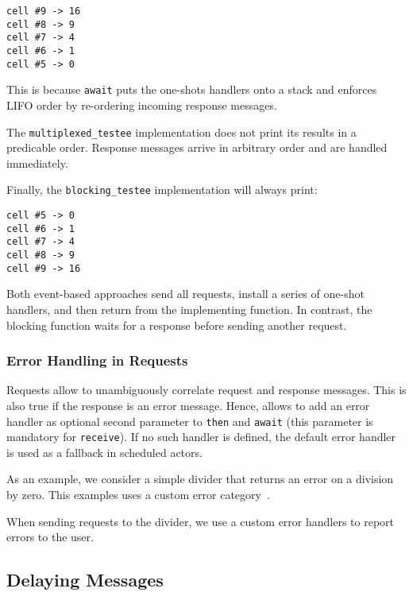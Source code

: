 {\footnotesize\begin{verbatim}
cell #9 -> 16
cell #8 -> 9
cell #7 -> 4
cell #6 -> 1
cell #5 -> 0
\end{verbatim}}

This is because \lstinline^await^ puts the one-shots handlers onto a stack and enforces LIFO order by re-ordering incoming response messages.

The \lstinline^multiplexed_testee^ implementation does not print its results in a predicable order. Response messages arrive in arbitrary order and are handled immediately.

Finally, the \lstinline^blocking_testee^ implementation will always print:

{\footnotesize\begin{verbatim}
cell #5 -> 0
cell #6 -> 1
cell #7 -> 4
cell #8 -> 9
cell #9 -> 16
\end{verbatim}}

Both event-based approaches send all requests, install a series of one-shot handlers, and then return from the implementing function. In contrast, the blocking function waits for a response before sending another request.

\clearpage
\subsubsection{Error Handling in Requests}
\label{error-response}

Requests allow \lib to unambiguously correlate request and response messages. This is also true if the response is an error message. Hence, \lib allows to add an error handler as optional second parameter to \lstinline^then^ and \lstinline^await^ (this parameter is mandatory for \lstinline^receive^). If no such handler is defined, the default error handler  is used as a fallback in scheduled actors.

As an example, we consider a simple divider that returns an error on a division by zero. This examples uses a custom error category~.



When sending requests to the divider, we use a custom error handlers to report errors to the user.



\clearpage
\subsection{Delaying Messages}
\label{delay-message}

